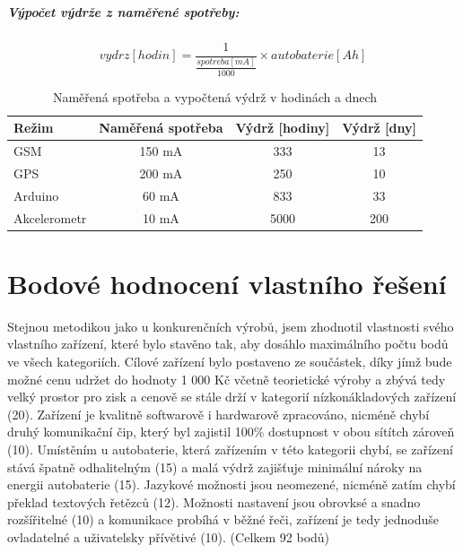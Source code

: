 \documentclass[FM,BP]{tulthesis}  %
\begin{document}
\paragraph{Výpočet výdrže z naměřené spotřeby:}
$$ vydrz [hodin] = \frac{1}{\frac{spotreba[mA]}{1000}} \times autobaterie[Ah] $$

\renewcommand{\arraystretch}{1.5}
\begin{table}[H]
\begin{center}
\begin{tabular}{| l | c | c |  c |}
\hline
Režim & Naměřená spotřeba & Výdrž [hodiny] & Výdrž [dny]\\
\hline
\hline
GSM & 150 mA & 333 & 13\\
\hline
GPS & 200 mA & 250 & 10\\
\hline
Arduino & 60 mA & 833 & 33\\
\hline
Akcelerometr & 10 mA & 5000 & 200\\
\hline
\end{tabular}
\end{center}
\caption{Naměřená spotřeba a vypočtená výdrž v hodinách a dnech}
\end{table}


\chapter{Bodové hodnocení vlastního řešení}
Stejnou metodikou jako u konkurenčních výrobů, jsem zhodnotil vlastnosti svého vlastního zařízení, které bylo stavěno tak, aby dosáhlo maximálního počtu bodů ve všech kategoriích. Cílové zařízení bylo postaveno ze součástek, díky jímž bude možné cenu udržet do hodnoty 1 000 Kč včetně teorietické výroby a zbývá tedy velký prostor pro zisk a cenově se stále drží v kategorií nízkonákladových zařízení (20). Zařízení je kvalitně softwarově i hardwarově zpracováno, nicméně chybí druhý komunikační čip, který byl zajistil 100\% dostupnost v obou sítítch zároveň (10). Umístěním u autobaterie, která zařízením v této kategorii chybí, se zařízení stává špatně odhalitelným (15) a malá výdrž zajišťuje minimální nároky na energii autobaterie (15). Jazykové možnosti jsou neomezené, nicméně zatím chybí překlad textových řetězců (12). Možnosti nastavení jsou obrovksé a snadno rozšířitelné (10) a komunikace probíhá v běžné řeči, zařízení je tedy jednoduše ovladatelné a uživatelsky přívětivé (10). (Celkem 92 bodů)
\end{document}
